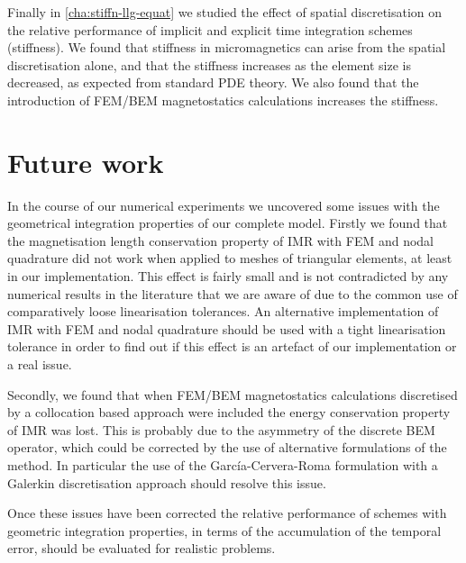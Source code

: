 Finally in \cref{cha:stiffn-llg-equat} we studied the effect of spatial discretisation on the relative performance of implicit and explicit time integration schemes (stiffness).
We found that stiffness in micromagnetics can arise from the spatial discretisation alone, and that the stiffness increases as the element size is decreased, as expected from standard PDE theory.
We also found that the introduction of FEM/BEM magnetostatics calculations increases the stiffness.



\section{Future work}


In the course of our numerical experiments we uncovered some issues with the geometrical integration properties of our complete model.
Firstly we found that the magnetisation length conservation property of IMR with FEM and nodal quadrature did not work when applied to meshes of triangular elements, at least in our implementation.
This effect is fairly small and is not contradicted by any numerical results in the literature that we are aware of due to the common use of comparatively loose linearisation tolerances.
An alternative implementation of IMR with FEM and nodal quadrature should be used with a tight linearisation tolerance in order to find out if this effect is an artefact of our implementation or a real issue.

Secondly, we found that when FEM/BEM magnetostatics calculations discretised by a collocation based approach were included the energy conservation property of IMR was lost.
This is probably due to the asymmetry of the discrete BEM operator, which could be corrected by the use of alternative formulations of the method.
In particular the use of the Garc\'{i}a-Cervera-Roma formulation \cite{Garcia-Cervera2006} with a Galerkin discretisation approach \cite[75]{Wrobel2002} should resolve this issue.

Once these issues have been corrected the relative performance of schemes with geometric integration properties, in terms of the accumulation of the temporal error, should be evaluated for realistic problems.

